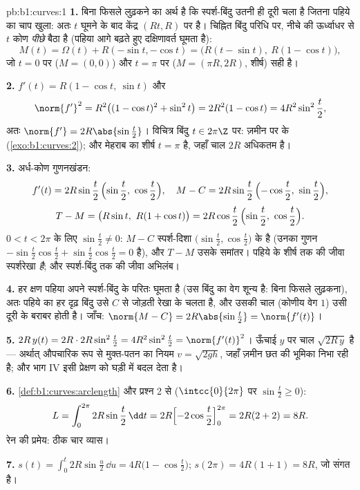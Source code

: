 \begin{solution}{pb:b1:curves:1}
\textbf{1.} बिना फिसले लुढ़कने का अर्थ है कि स्पर्श-बिंदु उतनी ही दूरी चला
है जितना पहिये का चाप खुला: अतः $t$ घूमने के बाद केंद्र $(Rt, R)$ पर है।
चिह्नित बिंदु परिधि पर, नीचे की ऊर्ध्वाधर से $t$ कोण \emph{पीछे} बैठा है
(पहिया आगे बढ़ते हुए दक्षिणावर्त घूमता है):
\[
M(t) = \Omega(t) + R(-\sin t, -\cos t)
= \bigl(R(t - \sin t),\ R(1 - \cos t)\bigr),
\]
जो $t = 0$ पर ($M = (0,0)$) और $t = \pi$ पर ($M = (\pi R, 2R)$, शीर्ष) सही
है।

\textbf{2.} $f'(t) = R(1 - \cos t,\ \sin t)$ और
\[
\norm{f'}^2 = R^2\bigl((1-\cos t)^2 + \sin^2 t\bigr)
= 2R^2(1 - \cos t) = 4R^2\sin^2\frac t2 ,
\]
अतः $\norm{f'} = 2R\abs{\sin\frac t2}$। विचित्र बिंदु $t \in 2\pi\Z$ पर:
ज़मीन पर के  (\cref{exo:b1:curves:2}); और मेहराब का शीर्ष $t = \pi$
है, जहाँ चाल $2R$ अधिकतम है।

\textbf{3.} अर्ध-कोण गुणनखंडन:
\[
f'(t) = 2R\sin\frac t2\,\Bigl(\sin\frac t2,\ \cos\frac t2\Bigr),
\quad
M - C = 2R\sin\frac t2\,\Bigl(-\cos\frac t2,\ \sin\frac t2\Bigr),
\]
\[
T - M = \bigl(R\sin t,\ R(1 + \cos t)\bigr)
= 2R\cos\frac t2\,\Bigl(\sin\frac t2,\ \cos\frac t2\Bigr).
\]
$0 < t < 2\pi$ के लिए $\sin\frac t2 \neq 0$: $M - C$ स्पर्श-दिशा
$\bigl(\sin\frac t2, \cos\frac t2\bigr)$ के  है (उनका गुणन $-\sin\frac
t2\cos\frac t2 + \sin\frac t2\cos\frac t2 = 0$ है), और $T - M$ उसके समांतर।
पहिये के शीर्ष तक की जीवा स्पर्शरेखा \emph{है}; और स्पर्श-बिंदु तक की जीवा
अभिलंब।

\textbf{4.} हर क्षण पहिया अपने स्पर्श-बिंदु के परितः घूमता है (उस बिंदु का
वेग शून्य है: बिना फिसले लुढ़कना), अतः पहिये का हर दृढ़ बिंदु उसे $C$ से
जोड़ती रेखा के  चलता है, और उसकी चाल (कोणीय वेग $1$) उसी दूरी के बराबर
होती है। जाँच: $\norm{M - C} = 2R\abs{\sin\frac t2} = \norm{f'(t)}$।

\textbf{5.} $2R\,y(t) = 2R\cdot 2R\sin^2\frac t2 = 4R^2\sin^2\frac t2 =
\norm{f'(t)}^2$। ऊँचाई $y$ पर चाल $\sqrt{2R\,y}$ है --- अर्थात् औपचारिक रूप
से मुक्त-पतन का नियम $v = \sqrt{2gh}$, जहाँ ज़मीन छत की भूमिका निभा रही है;
और भाग IV इसी प्रेक्षण को घड़ी में बदल देता है।

\textbf{6.} \cref{def:b1:curves:arclength} और प्रश्न 2 से ($\intcc{0}{2\pi}$
पर $\sin\frac t2 \geq 0$):
\[
L = \int_0^{2\pi} 2R\sin\frac t2\,\dd t
= 2R\Bigl[-2\cos\frac t2\Bigr]_0^{2\pi} = 2R(2 + 2) = 8R .
\]
रेन की प्रमेय: ठीक चार व्यास।

\textbf{7.} $s(t) = \int_0^t 2R\sin\frac u2\,\dd u = 4R\bigl(1 - \cos\frac
t2\bigr)$; $s(2\pi) = 4R(1+1) = 8R$, जो संगत है।


\end{solution}
